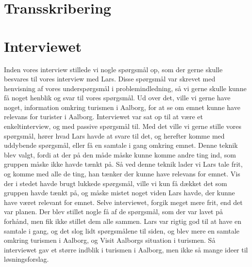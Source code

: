 \section{Transskribering}

\section{Interviewet}
Inden vores interview stillede vi nogle spørgsmål op, som der gerne skulle besvares til vores interview med Lars. Disse spørgsmål var skrevet med henvisning af vores underspørgsmål i problemindledning, så vi gerne skulle kunne få noget henblik og svar til vores spørgsmål. Ud over det, ville vi gerne have noget, information omkring turismen i Aalborg, for at se om emnet kunne have relevans for turister i Aalborg. 
Interviewet var sat op til at være et enkeltinterview, og med passive spørgsmål til. Med det ville vi gerne stille vores spørgsmål, hører hvad Lars havde at svare til det, og herefter komme med uddybende spørgsmål, eller få en samtale i gang omkring emnet. Denne teknik blev valgt, fordi at der på den måde måske kunne komme andre ting ind, som gruppen måske ikke havde tænkt på. Så ved denne teknik lader vi Lars tale frit, og komme med alle de ting, han tænker der kunne have relevans for emnet. Vis der i stedet havde brugt lukkede spørgsmål, ville vi kun få dækket det som gruppen havde tænkt på, og måske mistet noget viden Lars havde, der kunne have været relevant for emnet. 
Selve interviewet, forgik meget mere frit, end det var planen. Der blev stillet nogle få af de spørgsmål, som der var lavet på forhånd, men fik ikke stillet dem alle sammen. Lars var rigtig god til at have en samtale i gang, og det slog lidt spørgsmålene til siden, og blev mere en samtale omkring turismen i Aalborg, og Visit Aalborgs situation i turismen. Så interviewet gav et større indblik i turismen i Aalborg, men ikke så mange ideer til løsningsforslag.

